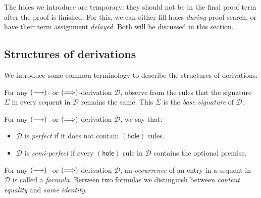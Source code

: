 \documentclass[twoside]{report}
\begin{document}
The holes we introduce are temporary: they should not be in the final proof term after the proof is finished. For this, we can either fill holes \emph{during} proof search, or have their term assignment \emph{delayed}. Both will be discussed in this section.

\subsection*{Structures of derivations}

We introduce some common terminology to describe the structures of derivations:

\newcommand{\preserved}{\operatorname{pre}}
\newcommand{\principal}{\operatorname{pri}}
\newcommand{\constituent}{\operatorname{con}}

\begin{definition}
\label{def:sequent_calculi_base_signatures}
For any $(\longrightarrow)$- or $(\Longrightarrow)$-derivation $\mathcal D$, observe from the rules that the signature $\Sigma$ in every sequent in $\mathcal D$ remains the same. This $\Sigma$ is the \emph{base signature} of $\mathcal D$.
\end{definition}

\begin{definition}
\label{def:sequent_calculi_classifications}
For any $(\longrightarrow)$- or $(\Longrightarrow)$-derivation $\mathcal D$, we say that:
\begin{itemize}[noitemsep]
    \item $\mathcal D$ is \emph{perfect} if it does not contain $(\mathsf{hole})$ rules.
    \item $\mathcal D$ is \emph{semi-perfect} if every $(\mathsf{hole})$ rule in $\mathcal D$ contains the optional premise.
\end{itemize}
\end{definition}

\begin{definition}[Formulas]
\label{def:sequent_calculi_formulas}
For any $(\longrightarrow)$- or $(\Longrightarrow)$-derivation $\mathcal D$, an \emph{occurrence} of an entry in a sequent in $\mathcal D$ is called a \emph{formula}. Between two formulas we distinguish between \emph{content equality} and \emph{same identity}.
\end{definition}
\end{document}
